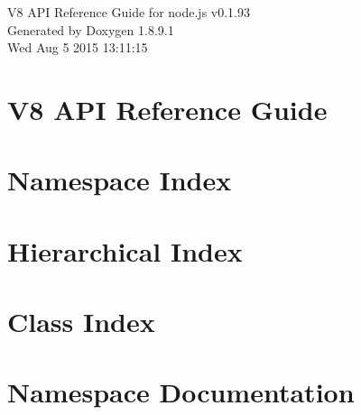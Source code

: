 \documentclass[twoside]{book}
\newcommand{\+}{\discretionary{\mbox{\scriptsize$\hookleftarrow$}}{}{}}
\newcommand{\clearemptydoublepage}{%
  \newpage{\pagestyle{empty}\cleardoublepage}%
}
\begin{document}
\hypersetup{pageanchor=false,
             bookmarks=true,
             bookmarksnumbered=true,
             pdfencoding=unicode
            }
\begin{titlepage}
\vspace*{7cm}
\begin{center}%
{\Large V8 A\+P\+I Reference Guide for node.\+js v0.1.93 }\\
\vspace*{1cm}
{\large Generated by Doxygen 1.8.9.1}\\
\vspace*{0.5cm}
{\small Wed Aug 5 2015 13:11:15}\\
\end{center}
\end{titlepage}
\clearemptydoublepage
\tableofcontents
\clearemptydoublepage
{}
\hypersetup{pageanchor=true}

\chapter{V8 A\+P\+I Reference Guide}
\label{index}\hypertarget{index}{}
\chapter{Namespace Index}

\chapter{Hierarchical Index}

\chapter{Class Index}

\chapter{Namespace Documentation}

\end{document}
